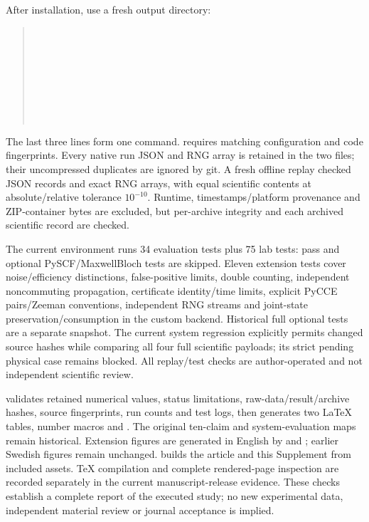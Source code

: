 After installation, use a fresh output directory:
\begin{quote}\small
{}\\
\\
\\
\\
\\
\\
\\
\end{quote}
The last three lines form one command.  requires matching configuration and code fingerprints. Every native run JSON and RNG array is retained in the two  files; their uncompressed duplicates are ignored by git. A fresh offline replay checked \ReplayRecords{} JSON records and \ReplayArrays{} exact RNG arrays, with equal scientific contents at absolute/relative tolerance $10^{-10}$. Runtime, timestamps/platform provenance and ZIP-container bytes are excluded, but per-archive integrity and each archived scientific record are checked.

The current environment runs 34 evaluation tests plus 75 lab tests: \LatestPass{} pass and \LatestSkip{} optional PySCF/MaxwellBloch tests are skipped. Eleven extension tests cover noise/efficiency distinctions, false-positive limits, double counting, independent noncommuting propagation, certificate identity/time limits, explicit PyCCE pairs/Zeeman conventions, independent RNG streams and joint-state preservation/consumption in the custom backend. Historical full optional tests are a separate snapshot. The current system regression explicitly permits changed source hashes while comparing all four full scientific payloads; its strict pending physical case remains blocked. All replay/test checks are author-operated and not independent scientific review.

 validates retained numerical values, status limitations, raw-data/result/archive hashes, source fingerprints, run counts and test logs, then generates two LaTeX tables, number macros and . The original ten-claim and system-evaluation maps remain historical. Extension figures are generated in English by  and ; earlier Swedish figures remain unchanged.  builds the article and this Supplement from included assets. TeX compilation and complete rendered-page inspection are recorded separately in the current manuscript-release evidence. These checks establish a complete report of the executed study; no new experimental data, independent material review or journal acceptance is implied.
